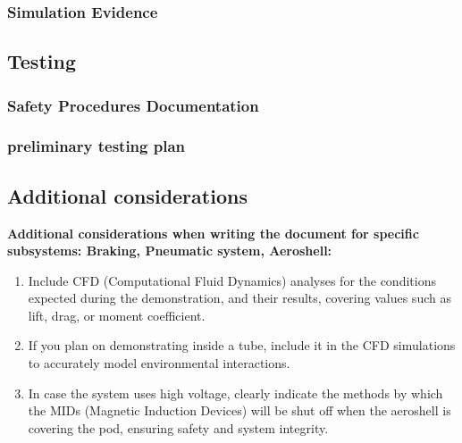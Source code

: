 \subsubsection{Simulation Evidence}



\subsection{Testing}
\subsubsection{Safety Procedures Documentation}

\subsubsection{preliminary testing plan}



\subsection{Additional considerations}
\textbf{Additional considerations when writing the document for specific subsystems: Braking, Pneumatic system, Aeroshell:}
\begin{enumerate}
  \item Include CFD (Computational Fluid Dynamics) analyses for the conditions expected during the demonstration, and their results, covering values such as lift, drag, or moment coefficient.
  \item If you plan on demonstrating inside a tube, include it in the CFD simulations to accurately model environmental interactions.
  \item In case the system uses high voltage, clearly indicate the methods by which the MIDs (Magnetic Induction Devices) will be shut off when the aeroshell is covering the pod, ensuring safety and system integrity.
\end{enumerate}
\newpage

